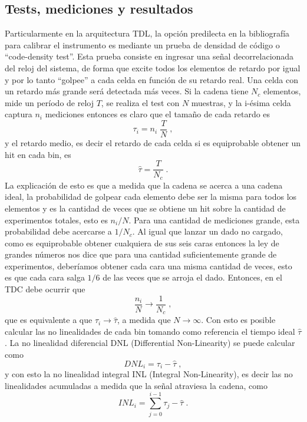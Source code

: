\subsection{Tests, mediciones y resultados}
Particularmente en la arquitectura TDL, la opción predilecta en la bibliografía para calibrar el instrumento es mediante 
un prueba de densidad de código o ``code-density test''. Esta prueba consiste en ingresar una señal decorrelacionada del reloj del sistema, de forma que 
excite todos los elementos de retardo por igual y por lo tanto ``golpee'' a cada celda en función de su retardo real.
Una celda con un retardo más grande será detectada más veces. 
Si la cadena tiene $N_c$ elementos, mide un período de reloj $T$, se realiza el test con $N$ muestras,
y la i-ésima celda captura $n_i$ mediciones entonces es claro que el 
tamaño de cada retardo es
\begin{equation}
     \tau_i = n_i \; \dfrac{T}{N} \; ,
     \label{eq: tau_i}
\end{equation}
y el retardo medio, es decir el retardo de cada celda si es equiprobable obtener un hit 
en cada bin, es
\begin{equation}
     \hat{\tau} = \dfrac{T}{N_c} \; .
     \label{eq: tau_medio}
\end{equation}
La explicación de esto es que a medida que la cadena se acerca a una cadena ideal, la probabilidad de golpear cada
elemento debe ser la misma para todos los elementos y es la cantidad de veces que se obtiene un hit
sobre la cantidad de experimentos totales, esto es $n_i/N$. Para una cantidad de mediciones grande,
esta probabilidad debe acercarse a $1/N_c$. Al igual que lanzar un dado no cargado, como es
equiprobable obtener cualquiera de sus seis caras entonces la ley de grandes números nos dice
que para una cantidad suficientemente grande de experimentos, deberíamos obtener cada cara una misma cantidad
de veces, esto es que cada cara salga $1/6$ de las veces que se arroja el dado.
Entonces, en el TDC debe ocurrir que 
\begin{equation*}
     \dfrac{n_i}{N} \longrightarrow \dfrac{1}{N_c} \; ,
\end{equation*}
que es equivalente a que $\tau_i \longrightarrow \hat{\tau}$, a medida que $N \rightarrow \infty$.
Con esto es posible calcular las no linealidades de cada bin tomando como referencia
el tiempo ideal $\hat{\tau}$. La no linealidad diferencial DNL (Differential Non-Linearity) 
se puede calcular como
\begin{equation}
     DNL_i = \tau_i - \hat{\tau} \; ,
     \label{eq: DNL}
\end{equation}
y con esto la no linealidad integral INL (Integral Non-Linearity), es decir las no linealidades acumuladas a medida que la 
señal atraviesa la cadena, como
\begin{equation}
     INL_i = \sum_{j=0}^{i-1} {\tau_j - \hat{\tau}} \; .
     \label{eq: INL}
\end{equation}

